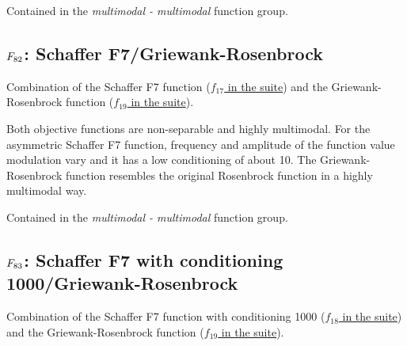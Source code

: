 Contained in the \emph{multimodal - multimodal} function group.



\subsection[\texorpdfstring{\protect\(F_{82}\protect\): Schaffer F7/Griewank-Rosenbrock}{F82: Schaffer F7/Griewank-Rosenbrock}]{\texorpdfstring{\protect\(F_{82}\protect\): Schaffer F7/Griewank-Rosenbrock}{}}
\label{index:schaffer-f7-griewank-rosenbrock}\label{index:f82}
Combination of the Schaffer F7 function (\href{https://coco.gforge.inria.fr/downloads/download16.00/bbobdocfunctions.pdf\#page=85}{\(f_{17}\) in the \bbob suite}) and the
Griewank-Rosenbrock function (\href{https://coco.gforge.inria.fr/downloads/download16.00/bbobdocfunctions.pdf\#page=95}{\(f_{19}\) in the \bbob suite}).

Both objective functions are non-separable and highly multimodal.
For the asymmetric Schaffer F7 function, frequency and amplitude of
the function value modulation vary and it has a low conditioning of
about 10. The Griewank-Rosenbrock function
resembles the original Rosenbrock function in a highly multimodal way.

Contained in the \emph{multimodal - multimodal} function group.



\subsection[\texorpdfstring{\protect\(F_{83}\protect\): Schaffer F7 with conditioning 1000/Griewank-Rosenbrock}{F83: Schaffer F7 with conditioning 1000/Griewank-Rosenbrock}]{\texorpdfstring{\protect\(F_{83}\protect\): Schaffer F7 with conditioning 1000/Griewank-Rosenbrock}{}}
\label{index:schaffer-f7-with-conditioning-1000-griewank-rosenbrock}\label{index:f83}
Combination of the Schaffer F7 function with conditioning 1000 (\href{https://coco.gforge.inria.fr/downloads/download16.00/bbobdocfunctions.pdf\#page=90}{\(f_{18}\) in the \bbob suite}) and the
Griewank-Rosenbrock function (\href{https://coco.gforge.inria.fr/downloads/download16.00/bbobdocfunctions.pdf\#page=95}{\(f_{19}\) in the \bbob suite}).


